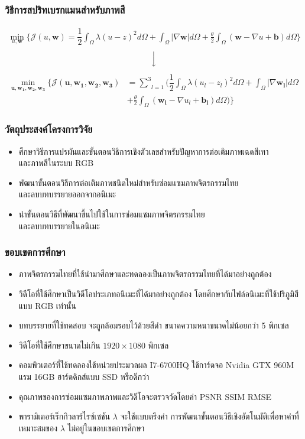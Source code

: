 \documentclass[xcolor=dvipsnames, xetex,serif]{beamer}
\numberwithin{equation}{section}
\begin{document}
		\begin{frame}
		\frametitle{วิธีการสปริทเบรกแมนสำหรับภาพสี}
			\begin{align*}
			\min_{u,\boldsymbol{w}} \{ \mathcal{J}(u,\boldsymbol{w}) = \dfrac{1}{2} \int_{\Omega} \lambda(u-z)^2 d\Omega +  \int_{\Omega}  |\nabla \boldsymbol{w}|  d\Omega + \frac{\theta}{2} \int_{\Omega} (\boldsymbol{w} - \nabla u + \boldsymbol{b}) d\Omega \}
			\end{align*}
			\begin{align*}
			\Big \downarrow
			\end{align*}
			\begin{align*}
			\min_{\boldsymbol{u},\boldsymbol{w_1},\boldsymbol{w_2},\boldsymbol{w_3}} \{ \mathcal{J}(\boldsymbol{u},\boldsymbol{w_1},\boldsymbol{w_2},\boldsymbol{w_3}) &= \underset{l=1}{\overset{3}{\sum}} (  \dfrac{1}{2} \int_{\Omega} \lambda(u_l-z_l)^2 d\Omega +  \int_{\Omega}  |\nabla \boldsymbol{w_l}|  d\Omega \\ &+ \frac{\theta}{2} \int_{\Omega} (\boldsymbol{w_l} - \nabla u_l+ \boldsymbol{b_l}) d\Omega ) \}
			\end{align*}
		\end{frame}		
		\begin{frame}
			\frametitle{วัตถุประสงค์โครงการวิจัย}
			\begin{itemize}
				\item ศึกษาวิธีการแปรผันและขั้นตอนวิธีการเชิงตัวเลขสำหรับปัญหาการต่อเติมภาพเฉดสีเทา\\และภาพสีในระบบ RGB
				\item พัฒนาขั้นตอนวิธีการต่อเติมภาพชนิดใหม่สำหรับซ่อมแซมภาพจิตรกรรมไทย\\และลบบทบรรยายออกจากอนิเมะ
				\item นำขั้นตอนวิธีที่พัฒนาขึ้นไปใช้ในการซ่อมแซมภาพจิตรกรรมไทย\\และลบบทบรรยายในอนิเมะ
			\end{itemize}
		\end{frame}
		\begin{frame}
			\frametitle{ขอบเขตการศึกษา}
			\begin{itemize}
				\item ภาพจิตรกรรมไทยที่ใช้นำมาศึกษาและทดลองเป็นภาพจิตรกรรมไทยที่ได้มาอย่างถูกต้อง
				\item วิดีโอที่ใช้ศึกษาเป็นวิดีโอประเภทอนิเมะที่ได้มาอย่างถูกต้อง โดยศึกษากับไฟล์อนิเมะที่ใช้ปริภูมิสีแบบ RGB เท่านั้น
				\item บทบรรยายที่ใช้ทดสอบ จะถูกล้อมรอบไว้ด้วยสีดำ ขนาดความหนาขนาดไม่น้อยกว่า 5 พิกเซล
				\item วิดีโอที่ใช้ศึกษาขนาดไม่เกิน $1920\times1080$ พิกเซล
				\item คอมพิวเตอร์ที่ใช้ทดลองใช้หน่วยประมวลผล I7-6700HQ ใช้การ์ดจอ Nvidia GTX 960M แรม 16GB ฮาร์ดดิกส์แบบ SSD หรือดีกว่า
				\item คุณภาพของการซ่อมแซมภาพภาพและวิดีโอจะตรวจวัดโดยค่า PSNR SSIM RMSE 
				\item พารามิเตอร์เร็กกิวลาร์ไรซ์เซชัน $\lambda$ จะใช้แบบตรึงค่า การพัฒนาขั้นตอนวิธีเชิงอัตโนมัติเพื่อหาค่าที่เหมาะสมของ $\lambda$ ไม่อยู่ในขอบเขตการศึกษา
			\end{itemize}
		\end{frame}
\end{document}
